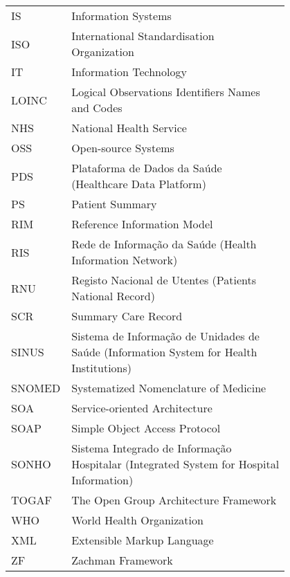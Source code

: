 \begin{flushleft}
\begin{tabular}{l p{0.8\linewidth}}
IS		& Information Systems \\
ISO		& International Standardisation Organization \\
IT		& Information Technology \\
LOINC   & Logical Observations Identifiers Names and Codes \\
NHS		& National Health Service \\
OSS		& Open-source Systems \\
PDS		& Plataforma de Dados da Saúde (Healthcare Data Platform) \\
PS		& Patient Summary \\
RIM		& Reference Information Model \\
RIS		& Rede de Informação da Saúde (Health Information Network) \\
RNU		& Registo Nacional de Utentes (Patients National Record) \\
SCR		& Summary Care Record \\
SINUS	& Sistema de Informação de Unidades de Saúde (Information System for Health Institutions)\\
SNOMED	& Systematized Nomenclature of Medicine \\
SOA		& Service-oriented Architecture \\
SOAP	& Simple Object Access Protocol \\
SONHO	& Sistema Integrado de Informação Hospitalar (Integrated System for Hospital Information) \\
TOGAF   & The Open Group Architecture Framework \\
WHO		& World Health Organization \\
XML	    & Extensible Markup Language \\
ZF		& Zachman Framework 
\end{tabular}
\end{flushleft}


